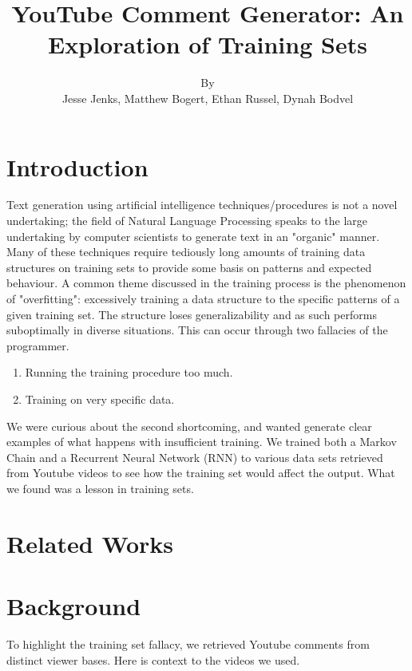 \documentclass[letterpaper]{article}
\begin{document}
%
\title{YouTube Comment Generator: An Exploration of Training Sets}
\author{By\\ Jesse Jenks, Matthew Bogert, Ethan Russel, Dynah Bodvel
}
\maketitle

\section{Introduction}
Text generation using artificial intelligence techniques/procedures is not a novel undertaking; the field of Natural Language Processing speaks to the large undertaking by computer scientists to generate text in an "organic" manner. Many of these techniques require tediously long amounts of training data structures on training sets to provide some basis on patterns and expected behaviour. A common theme discussed in the training process is the phenomenon of "overfitting": excessively training a data structure to the specific patterns of a given training set. The structure loses generalizability and as such performs suboptimally in diverse situations. This can occur through two fallacies of the programmer.

\begin{enumerate}
	\item Running the training procedure too much.
	\item Training on very specific data.
\end{enumerate}

We were curious about the second shortcoming, and wanted generate clear examples of what happens with insufficient training. We trained both a Markov Chain and a Recurrent Neural Network (RNN) to various data sets retrieved from Youtube videos to see how the training set would affect the output. What we found was a lesson in training sets.

\section{Related Works}

\section{Background}

To highlight the training set fallacy, we retrieved Youtube comments from distinct viewer bases. Here is context to the videos we used.
\end{document}
